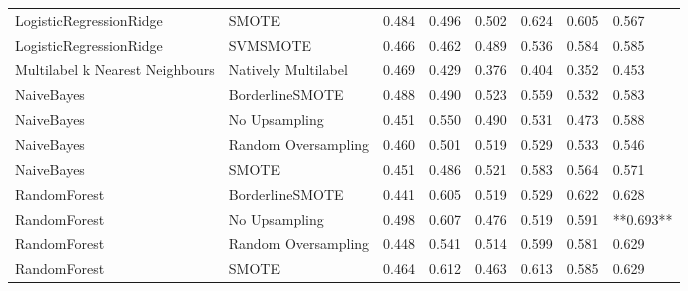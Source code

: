 \begin{tabular}{llllllll}
        LogisticRegressionRidge &                         SMOTE & 0.484 &                     0.496 &                 0.502 &                  0.624 &                                   0.605 &     0.567 \\
        LogisticRegressionRidge &                      SVMSMOTE & 0.466 &                     0.462 &                 0.489 &                  0.536 &                                   0.584 &     0.585 \\
Multilabel k Nearest Neighbours &           Natively Multilabel & 0.469 &                     0.429 &                 0.376 &                  0.404 &                                   0.352 &     0.453 \\
                     NaiveBayes &               BorderlineSMOTE & 0.488 &                     0.490 &                 0.523 &                  0.559 &                                   0.532 &     0.583 \\
                     NaiveBayes &                 No Upsampling & 0.451 &                     0.550 &                 0.490 &                  0.531 &                                   0.473 &     0.588 \\
                     NaiveBayes &           Random Oversampling & 0.460 &                     0.501 &                 0.519 &                  0.529 &                                   0.533 &     0.546 \\
                     NaiveBayes &                         SMOTE & 0.451 &                     0.486 &                 0.521 &                  0.583 &                                   0.564 &     0.571 \\
                   RandomForest &               BorderlineSMOTE & 0.441 &                     0.605 &                 0.519 &                  0.529 &                                   0.622 &     0.628 \\
                   RandomForest &                 No Upsampling & 0.498 &                     0.607 &                 0.476 &                  0.519 &                                   0.591 & **0.693** \\
                   RandomForest &           Random Oversampling & 0.448 &                     0.541 &                 0.514 &                  0.599 &                                   0.581 &     0.629 \\
                   RandomForest &                         SMOTE & 0.464 &                     0.612 &                 0.463 &                  0.613 &                                   0.585 &     0.629 \\

\end{tabular}
